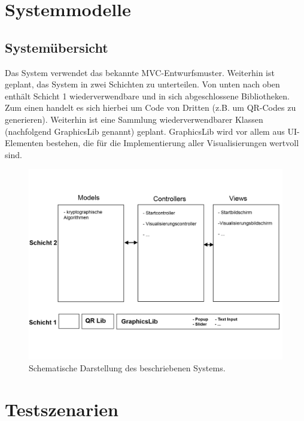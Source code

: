 \documentclass{article}
\begin{document}
\section{Systemmodelle}

\subsection{Systemübersicht}
Das System verwendet das bekannte \gls{MVC}-Entwurfsmuster. Weiterhin ist geplant, das System in zwei Schichten zu unterteilen. Von unten nach oben enthält Schicht 1 wiederverwendbare und in sich abgeschlossene Bibliotheken. Zum einen handelt es sich hierbei um Code von Dritten (z.B. um QR-Codes zu generieren). Weiterhin ist eine Sammlung wiederverwendbarer Klassen (nachfolgend \gls{GraphicsLib} genannt) geplant. \gls{GraphicsLib} wird vor allem aus \gls{UI}-Elementen bestehen, die für die Implementierung aller Visualisierungen wertvoll sind.

\begin{figure}[h!]
  \centering
    \includegraphics[width=\textwidth]{resources/systemmodel-draft}
  \caption{Schematische Darstellung des beschriebenen Systems.}
\end{figure}


\section{Testszenarien}
\end{document}
